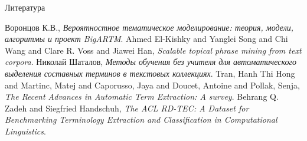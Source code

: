 \documentclass{beamer}
\begin{document}
\begin{frame}{Литература}
\begin{thebibliography}{5}
\beamertemplatebookbibitems
{}
\small{\sc Воронцов К.В.}, {\em Вероятностное тематическое моделирование: теория, модели, алгоритмы и проект BigARTM}.
{\sc Ahmed El-Kishky and Yanglei Song and Chi Wang and Clare R. Voss and Jiawei Han}, {\em Scalable topical phrase mining from text corpora}.
{\sc Николай Шаталов}, {\em Методы обучения без учителя для автоматического выделения составных терминов в текстовых коллекциях}.
{\sc Tran,  Hanh Thi Hong and Martinc,  Matej and Caporusso,  Jaya and Doucet,  Antoine and Pollak,  Senja}, {\em The Recent Advances in Automatic Term Extraction: A survey}.
{\sc Behrang Q. Zadeh and Siegfried Handschuh}, {\em The {ACL} {RD}-{TEC}: A Dataset for Benchmarking Terminology Extraction and Classification in Computational Linguistics}.
\end{thebibliography}
\end{frame}
\end{document}
